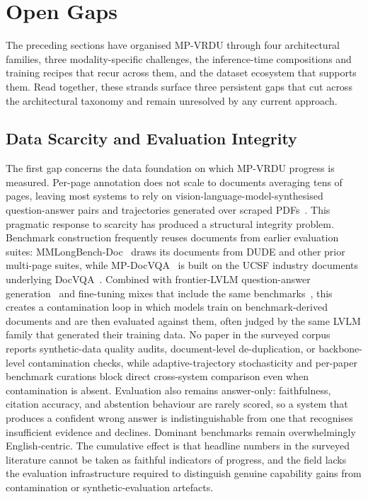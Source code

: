 \documentclass[11pt]{article}
\begin{document}


\section{Open Gaps}
\label{sec:gaps}

The preceding sections have organised MP-VRDU through four architectural families, three modality-specific challenges, the inference-time compositions and training recipes that recur across them, and the dataset ecosystem that supports them. Read together, these strands surface three persistent gaps that cut across the architectural taxonomy and remain unresolved by any current approach.

\subsection{Data Scarcity and Evaluation Integrity}
\label{sec:gap-data}

The first gap concerns the data foundation on which MP-VRDU progress is measured. Per-page annotation does not scale to documents averaging tens of pages, leaving most systems to rely on vision-language-model-synthesised question-answer pairs and trajectories generated over scraped PDFs~\cite{tanaka2024instructdoc,jain2025simpledoc,xiong2026docr1,zhang2026docdancer}. This pragmatic response to scarcity has produced a structural integrity problem. Benchmark construction frequently reuses documents from earlier evaluation suites: MMLongBench-Doc~\cite{ma2024mmlongbenchdoc} draws its documents from DUDE and other prior multi-page suites, while MP-DocVQA~\cite{tito2023hierarchical} is built on the UCSF industry documents underlying DocVQA~\cite{mathew2021docvqa}. Combined with frontier-LVLM question-answer generation~\cite{deng2025longdocurl} and fine-tuning mixes that include the same benchmarks~\cite{duan2025docopilot,xiong2026docr1}, this creates a contamination loop in which models train on benchmark-derived documents and are then evaluated against them, often judged by the same LVLM family that generated their training data. No paper in the surveyed corpus reports synthetic-data quality audits, document-level de-duplication, or backbone-level contamination checks, while adaptive-trajectory stochasticity and per-paper benchmark curations block direct cross-system comparison even when contamination is absent. Evaluation also remains answer-only: faithfulness, citation accuracy, and abstention behaviour are rarely scored, so a system that produces a confident wrong answer is indistinguishable from one that recognises insufficient evidence and declines. Dominant benchmarks remain overwhelmingly English-centric. The cumulative effect is that headline numbers in the surveyed literature cannot be taken as faithful indicators of progress, and the field lacks the evaluation infrastructure required to distinguish genuine capability gains from contamination or synthetic-evaluation artefacts.
\end{document}
